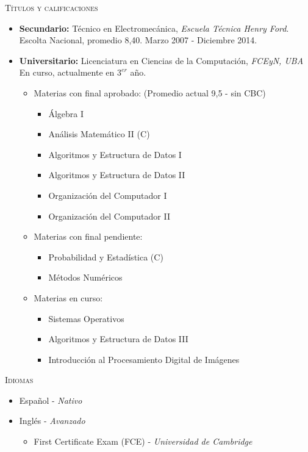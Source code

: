 \textsc{Títulos y calificaciones}
\begin{itemize}
    \item \textbf{Secundario:} Técnico en Electromecánica, \textit{Escuela Técnica Henry Ford}.
        Escolta Nacional, promedio 8,40. Marzo 2007 - Diciembre 2014.
    \item \textbf{Universitario:} Licenciatura en Ciencias de la Computación, \textit{FCEyN, UBA} En
        curso, actualmente en $3^{er}$ año.
        \begin{itemize}
            \item Materias con final aprobado: (Promedio actual 9,5 - sin CBC)
                \begin{itemize}
                    \item Álgebra I
                    \item Análisis Matemático II (C)
                    \item Algoritmos y Estructura de Datos I
                    \item Algoritmos y Estructura de Datos II
                    \item Organización del Computador I
                    \item Organización del Computador II
                \end{itemize}
            \item Materias con final pendiente:
                \begin{itemize}
                    \item Probabilidad y Estadística (C)
                    \item Métodos Numéricos
                \end{itemize}
            \item Materias en curso:
                \begin{itemize}
                    \item Sistemas Operativos
                    \item Algoritmos y Estructura de Datos III
                    \item Introducción al Procesamiento Digital de Imágenes
                \end{itemize}
        \end{itemize}
\end{itemize}

\textsc{Idiomas}
\begin{itemize}
    \item Español - \textit{Nativo}
    \item Inglés - \textit{Avanzado}
    \begin{itemize}
        \item First Certificate Exam (FCE) - \textit{Universidad de Cambridge}
    \end{itemize}
\end{itemize}

